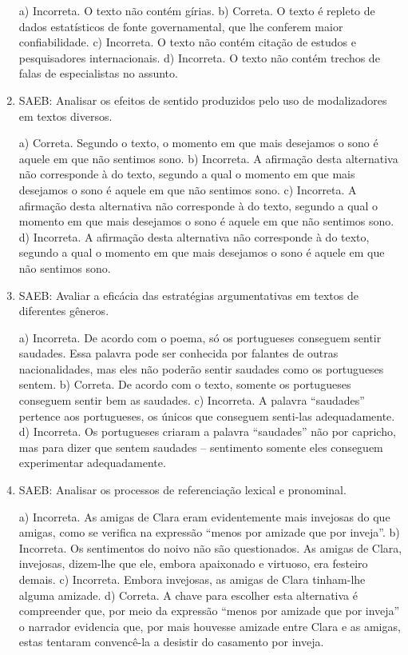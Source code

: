 \begin{enumerate}
a) Incorreta. O texto não contém gírias. 
b) Correta. O texto é repleto de dados estatísticos de fonte governamental, que lhe conferem maior confiabilidade.
c) Incorreta. O texto não contém citação de estudos e pesquisadores internacionais.
d) Incorreta. O texto não contém trechos de falas de especialistas no assunto.
	
	\item
SAEB: Analisar os efeitos de sentido produzidos pelo uso de modalizadores em
textos diversos.

a) Correta. Segundo o texto, o momento em que mais desejamos 
o sono é aquele em que não sentimos sono. 
b) Incorreta. A afirmação desta alternativa não corresponde à do texto, segundo a qual o momento em que mais desejamos 
o sono é aquele em que não sentimos sono.
c) Incorreta. A afirmação desta alternativa não corresponde à do texto, segundo a qual o momento em que mais desejamos 
o sono é aquele em que não sentimos sono.
d) Incorreta. A afirmação desta alternativa não corresponde à do texto, segundo a qual o momento em que mais desejamos 
o sono é aquele em que não sentimos sono.

	\item
SAEB: Avaliar a eficácia das estratégias argumentativas em textos de
diferentes gêneros.

a) Incorreta. De acordo com o poema, só os portugueses conseguem sentir saudades. Essa palavra pode ser conhecida por falantes de outras nacionalidades, mas eles não poderão sentir saudades como os portugueses sentem.  
b) Correta. De acordo com o texto, somente os portugueses conseguem sentir bem as saudades. 
c) Incorreta. A palavra ``saudades'' pertence aos portugueses, os únicos que conseguem senti-las adequadamente. 
d) Incorreta. Os portugueses criaram a palavra ``saudades'' não por capricho, mas para dizer que sentem saudades -- sentimento somente eles conseguem experimentar adequadamente. 

	\item
SAEB: Analisar os processos de referenciação lexical e pronominal.

a) Incorreta. As amigas de Clara eram evidentemente mais invejosas do que amigas, 
como se verifica na expressão ``menos por amizade que por inveja''.
b) Incorreta. Os sentimentos do noivo não são questionados. As amigas de Clara, 
invejosas, dizem-lhe que ele, embora apaixonado e virtuoso, era festeiro demais.
c) Incorreta. Embora invejosas, as amigas de Clara tinham-lhe alguma amizade.
d) Correta. A chave para escolher esta alternativa é compreender que, por meio da  
expressão ``menos por amizade que por inveja'' o narrador evidencia que, por mais 
houvesse amizade entre Clara e as amigas, estas tentaram convencê-la a desistir 
do casamento por inveja.
	

\end{enumerate}
